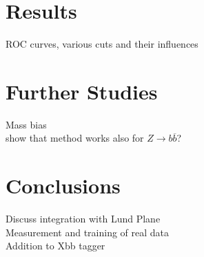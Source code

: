 \documentclass[10pt,a4paper]{book}
\begin{document}
\section{Results}
ROC curves, various cuts and their influences

\section{Further Studies}
Mass bias \\
show that method works also for $Z\rightarrow b\overline{b}$?

\section{Conclusions}
Discuss integration with Lund Plane \\
Measurement and training of real data \\
Addition to Xbb tagger

\end{document}
